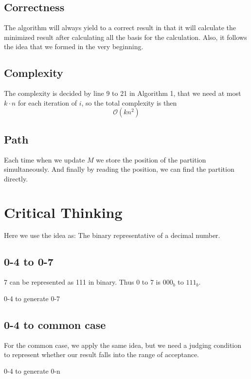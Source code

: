 \documentclass{article}
\begin{document}
\subsection{Correctness}
The algorithm will always yield to a correct result in that it will calculate the minimized result after calculating all the basis for the calculation. Also, it follows the idea that we formed in the very beginning.

\subsection{Complexity}
The complexity is decided by line 9 to 21 in Algorithm 1, that we need at most $k\cdot n$ for each iteration of $i$, so the total complexity is then
\[
	\mathcal{O}(kn^2)
\]

\subsection{Path}
Each time when we update $M$ we store the position of the partition simultaneously. And finally by reading the position, we can find the partition directly.
\newpage
\section{Critical Thinking}
Here we use the idea as: The binary representative of a decimal number.
\subsection*{0-4 to 0-7}
7 can be represented as 111 in binary. Thus 0 to 7 is $000_b$ to $111_b$.
\begin{algorithm}
\caption{0-4 to generate 0-7}
\end{algorithm}
\newpage
\subsection{0-4 to common case}
For the common case, we apply the same idea, but we need a judging condition to represent whether our result falls into the range of acceptance.
\begin{algorithm}
\caption{0-4 to generate 0-n}
\end{algorithm}
\newpage
\end{document}
